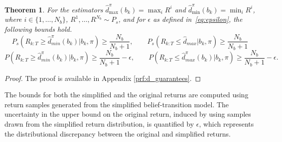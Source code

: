\documentclass[acmlarge, manuscript, screen, review, natbib=false, oneside]{acmart}
\newtheorem{theorem}{Theorem}[section]
\begin{document}
\begin{theorem}\label{thm:d_guarantees}
	For the estimators $\hat{d}_{\max}^\pi(b_k) = \max_{i} R^i$ and $\hat{d}_{\min}^\pi(b_k) = \min_{i} R^i$, where $i \in \{1,\dots,N_b\}$, $R^1,\dots,R^{N_b} \sim P_s$, and for $\epsilon$ as defined in~\eqref{eq:epsilon}, the following bounds hold.
	\begin{equation}
		P_s(R_{k:T} \geq \hat{d}_{min}^\pi(b_k) | b_k ,\pi)\geq\frac{N_b}{N_b+1}, \qquad P_s(R_{k:T} \leq \hat{d}_{max} | b_k ,\pi)\geq\frac{N_b}{N_b+1}
	\end{equation}
	\begin{equation}
		P\!\left(R_{k:T} \geq \hat{d}_{min}^\pi(b_k) \Big| b_k ,\pi \right)
		\geq \frac{N_b}{N_b+1} - \epsilon, \qquad
		P\!\left(R_{k:T} \leq \hat{d}_{max}^\pi(b_k) \Big| b_k ,\pi \right)
		\geq \frac{N_b}{N_b+1} - \epsilon.
	\end{equation}
\end{theorem}
\begin{proof}
	The proof is available in Appendix \ref{prf:d_guarantees}.
\end{proof}
The bounds for both the simplified and the original returns are computed using return samples generated from the simplified belief-transition model. The uncertainty in the upper bound on the original return, induced by using samples drawn from the simplified return distribution, is quantified by $\epsilon$, which represents the distributional discrepancy between the original and simplified returns.

\end{document}
